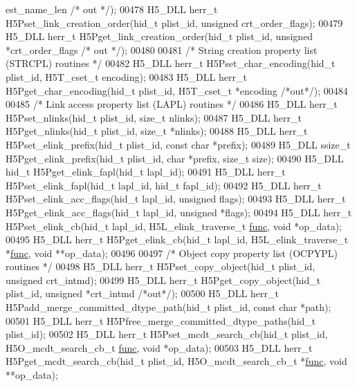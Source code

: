 \begin{DoxyCode}
      est\_name\_len \textcolor{comment}{/* out */});
00478 H5\_DLL herr\_t H5Pset\_link\_creation\_order(hid\_t plist\_id, \textcolor{keywordtype}{unsigned} crt\_order\_flags);
00479 H5\_DLL herr\_t H5Pget\_link\_creation\_order(hid\_t plist\_id, \textcolor{keywordtype}{unsigned} *crt\_order\_flags \textcolor{comment}{/* out */});
00480 
00481 \textcolor{comment}{/* String creation property list (STRCPL) routines */}
00482 H5\_DLL herr\_t H5Pset\_char\_encoding(hid\_t plist\_id, H5T\_cset\_t encoding);
00483 H5\_DLL herr\_t H5Pget\_char\_encoding(hid\_t plist\_id, H5T\_cset\_t *encoding \textcolor{comment}{/*out*/});
00484 
00485 \textcolor{comment}{/* Link access property list (LAPL) routines */}
00486 H5\_DLL herr\_t H5Pset\_nlinks(hid\_t plist\_id, \textcolor{keywordtype}{size\_t} nlinks);
00487 H5\_DLL herr\_t H5Pget\_nlinks(hid\_t plist\_id, \textcolor{keywordtype}{size\_t} *nlinks);
00488 H5\_DLL herr\_t H5Pset\_elink\_prefix(hid\_t plist\_id, \textcolor{keyword}{const} \textcolor{keywordtype}{char} *prefix);
00489 H5\_DLL ssize\_t H5Pget\_elink\_prefix(hid\_t plist\_id, \textcolor{keywordtype}{char} *prefix, \textcolor{keywordtype}{size\_t} size);
00490 H5\_DLL hid\_t H5Pget\_elink\_fapl(hid\_t lapl\_id);
00491 H5\_DLL herr\_t H5Pset\_elink\_fapl(hid\_t lapl\_id, hid\_t fapl\_id);
00492 H5\_DLL herr\_t H5Pset\_elink\_acc\_flags(hid\_t lapl\_id, \textcolor{keywordtype}{unsigned} flags);
00493 H5\_DLL herr\_t H5Pget\_elink\_acc\_flags(hid\_t lapl\_id, \textcolor{keywordtype}{unsigned} *flags);
00494 H5\_DLL herr\_t H5Pset\_elink\_cb(hid\_t lapl\_id, H5L\_elink\_traverse\_t \hyperlink{structfunc}{func}, \textcolor{keywordtype}{void} *op\_data);
00495 H5\_DLL herr\_t H5Pget\_elink\_cb(hid\_t lapl\_id, H5L\_elink\_traverse\_t *\hyperlink{structfunc}{func}, \textcolor{keywordtype}{void} **op\_data);
00496 
00497 \textcolor{comment}{/* Object copy property list (OCPYPL) routines */}
00498 H5\_DLL herr\_t H5Pset\_copy\_object(hid\_t plist\_id, \textcolor{keywordtype}{unsigned} crt\_intmd);
00499 H5\_DLL herr\_t H5Pget\_copy\_object(hid\_t plist\_id, \textcolor{keywordtype}{unsigned} *crt\_intmd \textcolor{comment}{/*out*/});
00500 H5\_DLL herr\_t H5Padd\_merge\_committed\_dtype\_path(hid\_t plist\_id, \textcolor{keyword}{const} \textcolor{keywordtype}{char} *path);
00501 H5\_DLL herr\_t H5Pfree\_merge\_committed\_dtype\_paths(hid\_t plist\_id);
00502 H5\_DLL herr\_t H5Pset\_mcdt\_search\_cb(hid\_t plist\_id, H5O\_mcdt\_search\_cb\_t \hyperlink{structfunc}{func}, \textcolor{keywordtype}{void} *op\_data);
00503 H5\_DLL herr\_t H5Pget\_mcdt\_search\_cb(hid\_t plist\_id, H5O\_mcdt\_search\_cb\_t *\hyperlink{structfunc}{func}, \textcolor{keywordtype}{void} **op\_data);

\end{DoxyCode}
